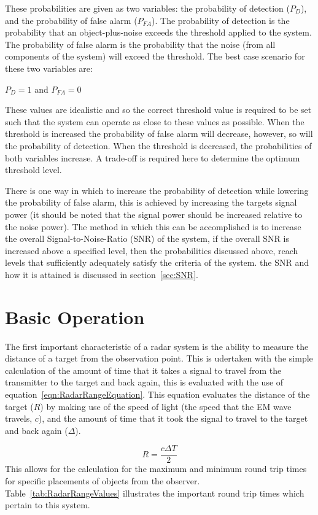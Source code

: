 \documentclass[11pt]{witseiepaper}
\begin{document}
These probabilities are given as two variables: the probability of detection ($P_{D}$), and the probability of false alarm ($P_{FA}$). The probability of detection is the probability that an object-plus-noise exceeds the threshold applied to the system. The probability of false alarm is the probability that the noise (from all components of the system) will exceed the threshold.
The best case scenario for these two variables are: 


$P_{D} = 1$ and $P_{FA} = 0$

These values are idealistic and so the correct threshold value is required to be set such that the system can operate as close to these values as possible.
When the threshold is increased the probability of false alarm will decrease, however, so will the probability of detection. When the threshold is decreased, the probabilities of both variables increase. A trade-off is required here to determine the optimum threshold level.

There is one way in which to increase the probability of detection while lowering the probability of false alarm, this is achieved by increasing the targets signal power (it should be noted that the signal power should be increased relative to the noise power). The method in which this can be accomplished is to increase the overall Signal-to-Noise-Ratio (SNR) of the system, if the overall SNR is increased above a specified level, then the probabilities discussed above, reach levels that sufficiently adequately satisfy the criteria of the system. the SNR and how it is attained is discussed in section~\ref{sec:SNR}. 


\section{Basic Operation} \label{sec:BasicOperation}
The first important characteristic of a radar system is the ability to measure the distance of a target from the observation point. This is udertaken with the simple calculation of the amount of time that it takes a signal to travel from the transmitter to the target and back again, this is evaluated with the use of equation~\ref{eqn:RadarRangeEquation}. This equation evaluates the distance of the target ($R$) by making use of the speed of light (the speed that the EM wave travels, $c$), and the amount of time that it took the signal to travel to the target and back again ($\Delta$).

\begin{equation} \label{eqn:RadarRangeEquation}
    R = \frac{c \Delta T}{2}
\end{equation}
This allows for the calculation for the maximum and minimum round trip times for specific placements of objects from the observer. Table~\ref{tab:RadarRangeValues} illustrates the important round trip times which pertain to this system.
\end{document}
